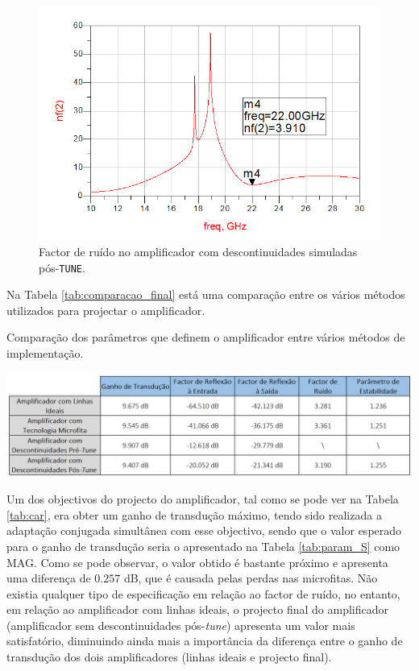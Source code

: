 \documentclass[11pt]{article}
\numberwithin{equation}{section}
\begin{document}
\begin{figure}[H]
	\centering
	\includegraphics[keepaspectratio=true, scale=0.45]{exps/descont_noise_pos_tune}
	\vspace{-0.5em}
	\caption{Factor de ruído no amplificador com descontinuidades simuladas pós-\texttt{TUNE}.}
	\vspace{-0.8em}
	\label{fig:descont_noise_pos_tune}
\end{figure}

Na Tabela \ref{tab:comparacao_final} está uma comparação entre os vários métodos utilizados para projectar o amplificador.

\begin{table}[H]
	\centering
	\caption{Comparação dos parâmetros que definem o amplificador entre vários métodos de implementação.}
	\vspace{-1.5mm}
	\includegraphics[keepaspectratio=true, scale=0.45]{exps/compfinal}
	\label{tab:comparacao_final}
\end{table}

Um dos objectivos do projecto do amplificador, tal como se pode ver na Tabela \ref{tab:car}, era obter um ganho de transdução máximo, tendo sido realizada a adaptação conjugada simultânea com esse objectivo, sendo que o valor esperado para o ganho de transdução seria o apresentado na Tabela \ref{tab:param_S} como MAG. Como se pode observar, o valor obtido é bastante próximo e apresenta uma diferença de $0.257$ dB, que é causada pelas perdas nas microfitas. Não existia qualquer tipo de especificação em relação ao factor de ruído, no entanto, em relação ao amplificador com linhas ideais, o projecto final do amplificador (amplificador sem descontinuidades pós-\textit{tune}) apresenta um valor mais satisfatório, diminuindo ainda mais a importância da diferença entre o ganho de transdução dos dois amplificadores (linhas ideais e projecto final).
\end{document}
